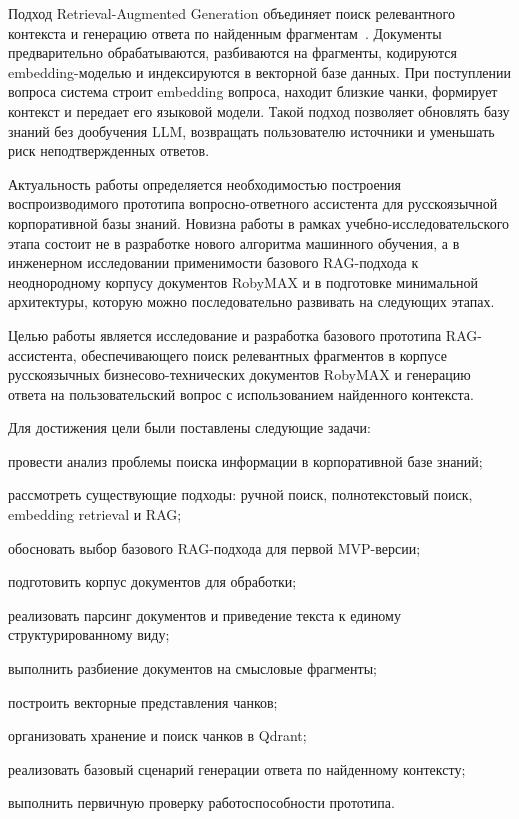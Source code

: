 Подход Retrieval-Augmented Generation объединяет поиск релевантного контекста и генерацию ответа по найденным фрагментам~\cite{Lewis2020RAG}. Документы предварительно обрабатываются, разбиваются на фрагменты, кодируются embedding-моделью и индексируются в векторной базе данных. При поступлении вопроса система строит embedding вопроса, находит близкие чанки, формирует контекст и передает его языковой модели. Такой подход позволяет обновлять базу знаний без дообучения LLM, возвращать пользователю источники и уменьшать риск неподтвержденных ответов.

Актуальность работы определяется необходимостью построения воспроизводимого прототипа вопросно-ответного ассистента для русскоязычной корпоративной базы знаний. Новизна работы в рамках учебно-исследовательского этапа состоит не в разработке нового алгоритма машинного обучения, а в инженерном исследовании применимости базового RAG-подхода к неоднородному корпусу документов RobyMAX и в подготовке минимальной архитектуры, которую можно последовательно развивать на следующих этапах.

Целью работы является исследование и разработка базового прототипа RAG-ассистента, обеспечивающего поиск релевантных фрагментов в корпусе русскоязычных бизнесово-технических документов RobyMAX и генерацию ответа на пользовательский вопрос с использованием найденного контекста.

Для достижения цели были поставлены следующие задачи:
\begin{compactenum}
  \item провести анализ проблемы поиска информации в корпоративной базе знаний;
  \item рассмотреть существующие подходы: ручной поиск, полнотекстовый поиск, embedding retrieval и RAG;
  \item обосновать выбор базового RAG-подхода для первой MVP-версии;
  \item подготовить корпус документов для обработки;
  \item реализовать парсинг документов и приведение текста к единому структурированному виду;
  \item выполнить разбиение документов на смысловые фрагменты;
  \item построить векторные представления чанков;
  \item организовать хранение и поиск чанков в Qdrant;
  \item реализовать базовый сценарий генерации ответа по найденному контексту;
  \item выполнить первичную проверку работоспособности прототипа.
\end{compactenum}

